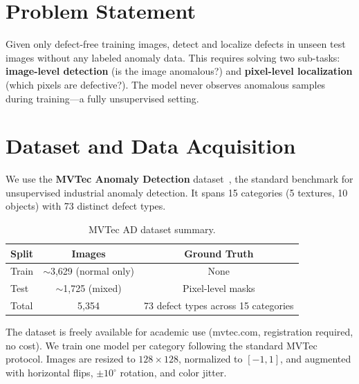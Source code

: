 \documentclass[12pt,a4paper]{article}
\begin{document}
\section{Problem Statement}

Given only defect-free training images, detect and localize defects in unseen
test images without any labeled anomaly data. This requires solving two
sub-tasks: \textbf{image-level detection} (is the image anomalous?) and
\textbf{pixel-level localization} (which pixels are defective?). The model never
observes anomalous samples during training---a fully unsupervised setting.

\section{Dataset and Data Acquisition}

We use the \textbf{MVTec Anomaly Detection} dataset~\cite{bergmann2019}, the
standard benchmark for unsupervised industrial anomaly detection. It spans
15 categories (5 textures, 10 objects) with 73 distinct defect types.

\begin{table}[H]
\centering
\caption{MVTec AD dataset summary.}
\begin{tabular}{@{}lcc@{}}
\toprule
\textbf{Split} & \textbf{Images} & \textbf{Ground Truth} \\
\midrule
Train & $\sim$3{,}629 (normal only) & None \\
Test  & $\sim$1{,}725 (mixed)       & Pixel-level masks \\
\midrule
Total & 5{,}354 & 73 defect types across 15 categories \\
\bottomrule
\end{tabular}
\end{table}

The dataset is freely available for academic use (mvtec.com, registration
required, no cost). We train one model per category following the standard
MVTec protocol. Images are resized to $128 \times 128$, normalized to $[-1,1]$,
and augmented with horizontal flips, $\pm10^{\circ}$ rotation, and color jitter.

\end{document}
